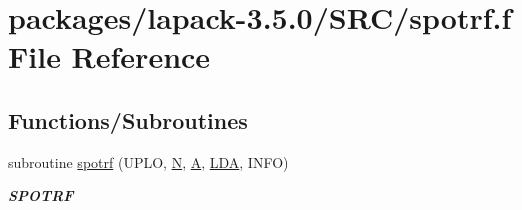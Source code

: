 \hypertarget{spotrf_8f}{}\section{packages/lapack-\/3.5.0/\+S\+R\+C/spotrf.f File Reference}
\label{spotrf_8f}
\subsection*{Functions/\+Subroutines}
\begin{DoxyCompactItemize}
\item 
subroutine \hyperlink{group__realPOcomputational_gaaf31db7ab15b4f4ba527a3d31a15a58e}{spotrf} (U\+P\+L\+O, \hyperlink{polmisc_8c_a0240ac851181b84ac374872dc5434ee4}{N}, \hyperlink{classA}{A}, \hyperlink{example__user_8c_ae946da542ce0db94dced19b2ecefd1aa}{L\+D\+A}, I\+N\+F\+O)
\begin{DoxyCompactList}\small\item\em {\bfseries S\+P\+O\+T\+R\+F} \end{DoxyCompactList}\end{DoxyCompactItemize}
